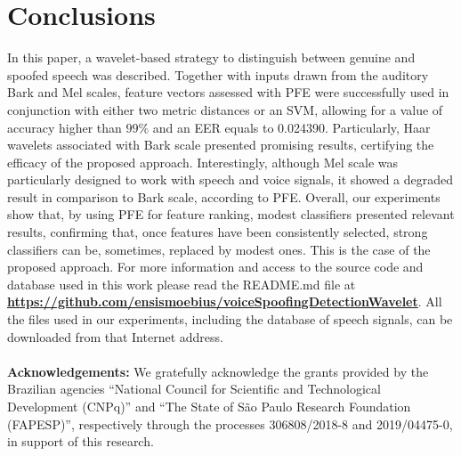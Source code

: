 \section{Conclusions}
\label{sec:conclusions}
\par In this paper, a wavelet-based strategy to distinguish between genuine and spoofed speech was described. Together with inputs drawn  from the auditory Bark and Mel scales, feature vectors assessed with PFE were successfully used in conjunction with either two metric distances or an SVM, allowing for a value of accuracy higher than $99\%$ and an EER equals to 0.024390. Particularly, Haar wavelets associated with Bark scale presented promising results, certifying the efficacy of the proposed approach. Interestingly, although Mel scale was particularly designed to work with speech and voice signals, it showed a degraded result in comparison to Bark scale, according to PFE. Overall, our experiments show that, by using PFE for feature ranking, modest classifiers presented relevant results, confirming that, once features have been consistently selected, strong classifiers can be, sometimes, replaced by modest ones. This is the case of the proposed approach. For more information and access to the source code and database used in this work please read the README.md file at \href{https://github.com/ensismoebius/voiceSpoofingDetectionWavelet}{\textbf{https://github.com/ensismoebius/voiceSpoofingDetectionWavelet}}. All the files used in our experiments, including the database of speech signals, can be downloaded from that Internet address. 
\\
\\
\textbf{Acknowledgements:} We gratefully acknowledge the grants provided by the Brazilian agencies ``National Council for Scientific and Technological Development (CNPq)'' and ``The State of S\~{a}o Paulo Research Foundation (FAPESP)'', respectively through the processes 306808/2018-8 and 2019/04475-0, in support of this research.

